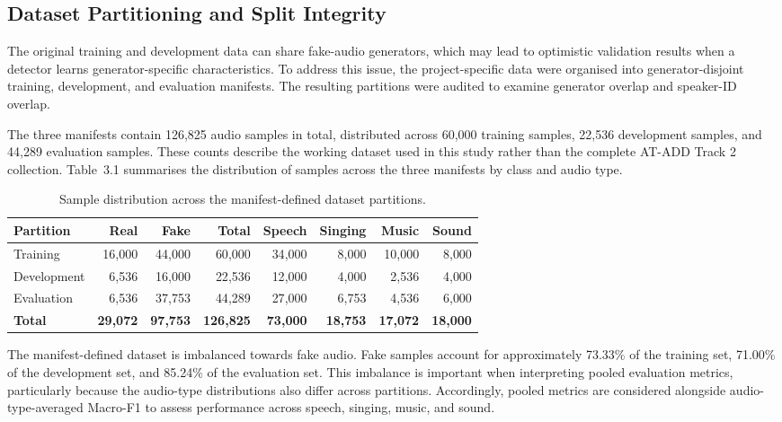 \documentclass[12pt,a4paper]{report}
\begin{document}
\subsection{Dataset Partitioning and Split Integrity}
\label{sec:partitioning}
\label{sec:overlap}

The original training and development data can share fake-audio generators, which may lead to optimistic validation results when a detector learns generator-specific characteristics. To address this issue, the project-specific data were organised into generator-disjoint training, development, and evaluation manifests. The resulting partitions were audited to examine generator overlap and speaker-ID overlap.

The three manifests contain 126,825 audio samples in total, distributed across 60,000 training samples, 22,536 development samples, and 44,289 evaluation samples. These counts describe the working dataset used in this study rather than the complete AT-ADD Track 2 collection. Table~3.1 summarises the distribution of samples across the three manifests by class and audio type.

\begin{table}[htbp]
\centering
\caption{Sample distribution across the manifest-defined dataset partitions.}
\label{tab:dataset-manifests}
\label{tab:dataset-eval}
\small
\begin{tabular}{@{}lrrrrrrr@{}}
\toprule
Partition & Real & Fake & Total & Speech & Singing & Music & Sound \\
\midrule
Training    & 16{,}000 & 44{,}000 & 60{,}000  & 34{,}000 & 8{,}000 & 10{,}000 & 8{,}000 \\
Development & 6{,}536  & 16{,}000 & 22{,}536  & 12{,}000 & 4{,}000 & 2{,}536  & 4{,}000 \\
Evaluation  & 6{,}536  & 37{,}753 & 44{,}289  & 27{,}000 & 6{,}753 & 4{,}536  & 6{,}000 \\
\midrule
\textbf{Total} & \textbf{29{,}072} & \textbf{97{,}753} & \textbf{126{,}825} & \textbf{73{,}000} & \textbf{18{,}753} & \textbf{17{,}072} & \textbf{18{,}000} \\
\bottomrule
\end{tabular}
\end{table}

The manifest-defined dataset is imbalanced towards fake audio. Fake samples account for approximately 73.33\% of the training set, 71.00\% of the development set, and 85.24\% of the evaluation set. This imbalance is important when interpreting pooled evaluation metrics, particularly because the audio-type distributions also differ across partitions. Accordingly, pooled metrics are considered alongside audio-type-averaged Macro-F1 to assess performance across speech, singing, music, and sound.
\end{document}
